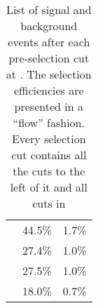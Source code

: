 \begin{table}[!tbp]
\begin{tabular}{lrr}
\gammagamma{\Pphoton}{\BS}{\Pphoton}{\BS}{ \Pquark \Pquark \Pquark \Pquark}& 44.5\%& 1.7\%\\
\gammagamma{\Pphoton}{\BS}{\Pphoton}{\EPA}{ \Pquark \Pquark \Pquark \Pquark}& 27.4\%& 1.0\%\\
\gammagamma{\Pphoton}{\EPA}{\Pphoton}{\BS}{ \Pquark \Pquark \Pquark \Pquark}& 27.5\%& 1.0\%\\
\gammagamma{\Pphoton}{\EPA}{\Pphoton}{\EPA}{ \Pquark \Pquark \Pquark \Pquark} & 18.0\% & 0.7\%\\
\hline \hline
\end{tabular}
\caption
{List of signal and background events after each pre-selection cut at .  The selection efficiencies are presented in a ``flow'' fashion. Every selection cut contains all the cuts to the left of it and all  cuts in }
\label{tab:doubleHiggs3TeVPreslectionPart2}
\end{table}


%
